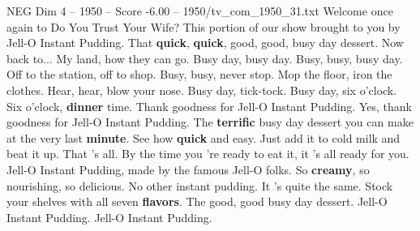 \begin{textsample}{NEG Dim 4 – 1950 – Score -6.00 – 1950/tv\_com\_1950\_31.txt}  \label{ex:f4_neg_003}
Welcome once again to Do You Trust Your Wife?
This portion of our show brought to you by Jell-O Instant Pudding.
That \textbf{quick}, \textbf{quick}, good, good, busy day dessert.
Now back to...
My land, how they can go.
Busy day, busy day.
Busy, busy, busy day.
Off to the station, off to shop.
Busy, busy, never stop.
Mop the floor, iron the clothes.
Hear, hear, blow your nose.
Busy day, tick-tock.
Busy day, six o'clock.
Six o'clock, \textbf{dinner} time.
Thank goodness for Jell-O Instant Pudding.
Yes, thank goodness for Jell-O Instant Pudding.
The \textbf{terrific} busy day dessert you can make at the very last \textbf{minute}.
See how \textbf{quick} and easy.
Just add it to cold milk and beat it up.
That 's all.
By the time you 're ready to eat it, it 's all ready for you.
Jell-O Instant Pudding, made by the famous Jell-O folks.
So \textbf{creamy}, so nourishing, so delicious.
No other instant pudding.
It 's quite the same.
Stock your shelves with all seven \textbf{flavors}.
The good, good busy day dessert.
Jell-O Instant Pudding.
Jell-O Instant Pudding.

\end{textsample}
